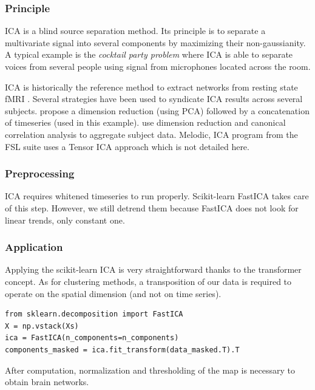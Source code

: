 \documentclass{frontiersSCNS} %
\begin{document}
\subsubsection{Principle}

ICA is a blind source separation method. Its principle is to separate a
multivariate signal into several components by maximizing their non-gaussianity.
A typical example is the \emph{cocktail party problem} where ICA is able to separate
voices from several people using signal from microphones located across the room.

ICA is historically the reference method to extract networks from resting state
fMRI \cite{biswal1999}. Several strategies have been used to syndicate ICA
results across several subjects. \cite{calhoun2001a} propose a dimension
reduction (using PCA) followed by a concatenation of timeseries (used in this
example). \cite{varoquaux2010} use dimension reduction and canonical correlation analysis
to aggregate subject data. Melodic, ICA program from the FSL suite uses a Tensor
ICA approach which is not detailed here.

\subsubsection{Preprocessing}

ICA requires whitened timeseries to run properly. Scikit-learn FastICA takes care
of this step. However, we still detrend them because
FastICA does not look for linear trends, only constant one.

\subsubsection{Application}


Applying the scikit-learn ICA is very straightforward thanks to the transformer
concept. As for clustering methods, a transposition of our data is required to
operate on the spatial dimension (and not on time series).

\begin{lstlisting}
from sklearn.decomposition import FastICA
X = np.vstack(Xs)
ica = FastICA(n_components=n_components)
components_masked = ica.fit_transform(data_masked.T).T
\end{lstlisting}

After computation, normalization and thresholding of the map is necessary to
obtain brain networks.
\end{document}
